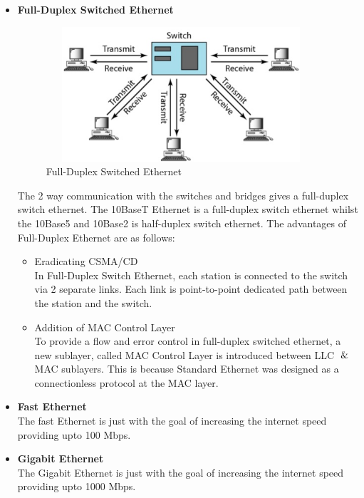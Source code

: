 \documentclass[12pt]{article}
\begin{document}
\begin{itemize}
    \item \textbf{Full-Duplex Switched Ethernet} \\
        \begin{figure}
            \centering
            \includegraphics[width=10cm, height=5cm]{full_duplex_switched_ethernet.png}
            \caption{Full-Duplex Switched Ethernet}
        \end{figure}
        The 2 way communication with the switches and bridges gives a full-duplex switch ethernet. The 10BaseT Ethernet is a full-duplex switch ethernet whilst the 10Base5 and 10Base2 is half-duplex switch ethernet. The advantages of Full-Duplex Ethernet are as follows:
        \begin{itemize}
            \item Eradicating CSMA/CD \\
                In Full-Duplex Switch Ethernet, each station is connected to the switch via 2 separate links. Each link is point-to-point dedicated path between the station and the switch. 
            \item Addition of MAC Control Layer \\
                To provide a flow and error control in full-duplex switched ethernet, a new sublayer, called MAC Control Layer is introduced between LLC $\And$ MAC sublayers. This is because Standard Ethernet was designed as a connectionless protocol at the MAC layer.
        \end{itemize}
    \item \textbf{Fast Ethernet} \\
        The fast Ethernet is just with the goal of increasing the internet speed providing upto 100 Mbps.
    \item \textbf{Gigabit Ethernet} \\
        The Gigabit Ethernet is just with the goal of increasing the internet speed providing upto 1000 Mbps.
\end{itemize}
\end{document}

